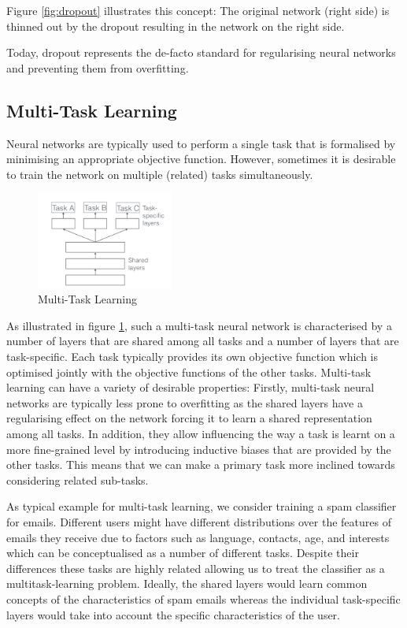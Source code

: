 

Figure \ref{fig:dropout} illustrates this concept: The original network (right side) is thinned out by the dropout resulting in the network on the right side. 

Today, dropout represents the de-facto standard for regularising neural networks and preventing them from overfitting. 


\subsection{Multi-Task Learning}
Neural networks are typically used to perform a single task that is formalised by minimising an appropriate objective function. However, sometimes it is desirable to train the network on multiple (related) tasks simultaneously. 
\begin{figure}
	\caption{Multi-Task Learning}\label{fig:multitask-learning}   
	\centering
	\includegraphics[width=0.4\textwidth]{figures/chapter-2/multitask-learning.png}
\end{figure}
As illustrated in figure \ref{fig:multitask-learning}, such a multi-task neural network is characterised by a number of layers that are shared among all tasks and a number of layers that are task-specific. Each task typically provides its own objective function which is optimised jointly with the objective functions of the other tasks. 
Multi-task learning can have a variety of desirable properties: Firstly, multi-task neural networks are typically less prone to overfitting as the shared layers have a regularising effect on the network forcing it to learn a shared representation among all tasks. In addition, they allow influencing the way a task is learnt on a more fine-grained level by introducing inductive biases that are provided by the other tasks. This means that we can make a primary task more inclined towards considering related sub-tasks. 

As typical example for multi-task learning, we consider training a spam classifier for emails. Different users might have different distributions over the features of emails they receive due to factors such as language, contacts, age, and interests which can be conceptualised as a number of different tasks. Despite their differences these tasks are highly related allowing us to treat the classifier as a multitask-learning problem. Ideally, the shared layers would learn common concepts of the characteristics of spam emails whereas the individual task-specific layers would take into account the specific characteristics of the user. 

